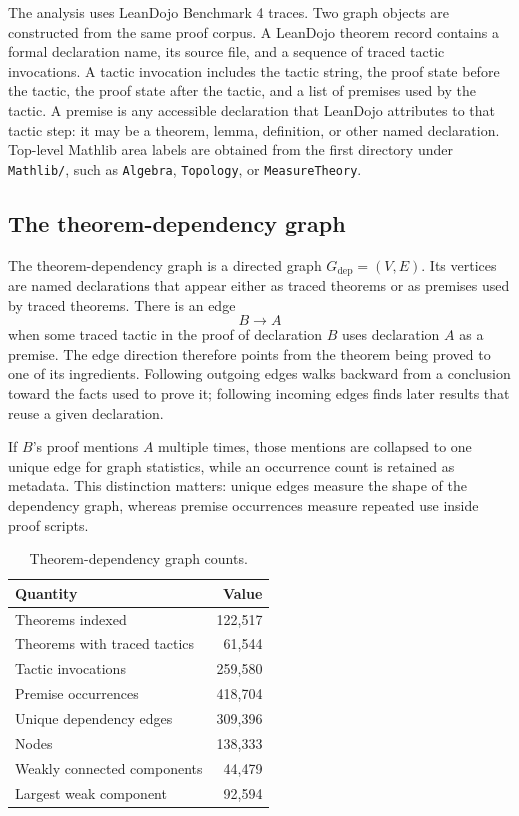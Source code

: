 \documentclass[11pt]{article}
\begin{document}
The analysis uses LeanDojo Benchmark 4 traces. Two graph objects are constructed
from the same proof corpus. A LeanDojo theorem record contains a formal
declaration name, its source file, and a sequence of traced tactic invocations.
A tactic invocation includes the tactic string, the proof state before the
tactic, the proof state after the tactic, and a list of premises used by the
tactic. A premise is any accessible declaration that LeanDojo attributes to
that tactic step: it may be a theorem, lemma, definition, or other named
declaration. Top-level Mathlib area labels are obtained from the first
directory under \texttt{Mathlib/}, such as \texttt{Algebra},
\texttt{Topology}, or \texttt{MeasureTheory}.

\subsection{The theorem-dependency graph}

The theorem-dependency graph is a directed graph $G_{\mathrm{dep}}=(V,E)$. Its
vertices are named declarations that appear either as traced theorems or as
premises used by traced theorems. There is an edge
\[
B \to A
\]
when some traced tactic in the proof of declaration $B$ uses declaration $A$ as
a premise. The edge direction therefore points from the theorem being proved to
one of its ingredients. Following outgoing edges walks backward from a
conclusion toward the facts used to prove it; following incoming edges finds
later results that reuse a given declaration.

If $B$'s proof mentions $A$ multiple times, those mentions are collapsed to one
unique edge for graph statistics, while an occurrence count is retained as
metadata. This distinction matters: unique edges measure the shape of the
dependency graph, whereas premise occurrences measure repeated use inside proof
scripts.

\begin{table}[h]
\centering
\begin{tabular}{lr}
\toprule
Quantity & Value \\
\midrule
Theorems indexed & 122,517 \\
Theorems with traced tactics & 61,544 \\
Tactic invocations & 259,580 \\
Premise occurrences & 418,704 \\
Unique dependency edges & 309,396 \\
Nodes & 138,333 \\
Weakly connected components & 44,479 \\
Largest weak component & 92,594 \\
\bottomrule
\end{tabular}
\caption{Theorem-dependency graph counts.}
\end{table}
\end{document}
